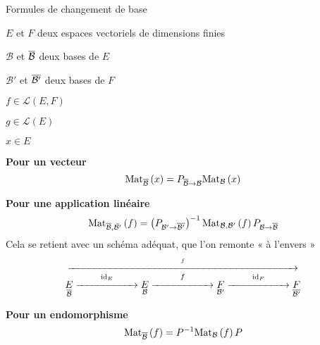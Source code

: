     \begin{theo}{Formules de changement de base}{}
        \begin{soient}
            \item $E$ et $F$ deux espaces vectoriels de dimensions finies
            \item $\mathcal{B}$ et $\overline{\mathcal{B}}$ deux bases de $E$
            \item $\mathcal{B}'$ et $\overline{\mathcal{B}'}$ deux bases de $F$
            \item $f \in \mathcal{L}(E,F)$
            \item $g \in \mathcal{L}(E)$
            \item $x \in E$
        \end{soient}
        \begin{alors}
            \item \textbf{Pour un vecteur}
            \[ \text{Mat}_{\overline{\mathcal{B}}}\left(x\right) = P_{\overline{\mathcal{B}} \rightarrow \mathcal{B}}\text{Mat}_{\mathcal{B}}\left(x\right) \]
            \item \textbf{Pour une application linéaire} 
            \[ \text{Mat}_{\overline{\mathcal{B}}, \bar{\mathcal{B}'}}\left(f\right) = \left(P_{\mathcal{B}' \rightarrow \overline{\mathcal{B}'}}\right)^{-1} \text{Mat}_{\mathcal{B},\mathcal{B}'}\left(f\right) P_{\mathcal{B} \rightarrow \overline{\mathcal{B}}} \]
            Cela se retient avec un schéma adéquat, que l’on remonte « à l’envers »
            \[ \overset{\overset{f}{\xrightarrow{\hspace*{8cm}}}}{\underset{\barr{\mathcal{B}}}{E} \overset{\id_E}{\xrightarrow{\hspace*{2cm}}} \underset{\mathcal{B}}{E} \overset{f}{\xrightarrow{\hspace*{2cm}}} \underset{\mathcal{B}'}{F} \overset{\id_F}{\xrightarrow{\hspace*{2cm}}} \underset{\barr{\mathcal{B}'}}{F}} \]  
            \item \textbf{Pour un endomorphisme} 
            \[ \text{Mat}_{\overline{\mathcal{B}}}\left(f\right) = P^{-1} \text{Mat}_{\mathcal{B}}\left(f\right) P \]
        \end{alors}
    \end{theo}

